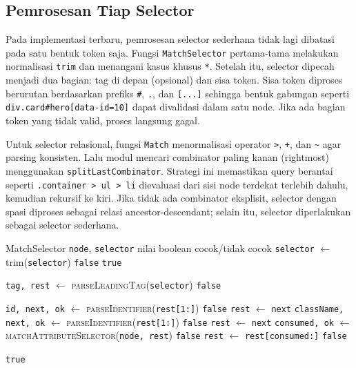 \subsection{Pemrosesan Tiap Selector}

Pada implementasi terbaru, pemrosesan selector sederhana tidak lagi dibatasi pada satu bentuk token saja. Fungsi \texttt{MatchSelector} pertama-tama melakukan normalisasi \texttt{trim} dan menangani kasus khusus \texttt{*}. Setelah itu, selector dipecah menjadi dua bagian: tag di depan (opsional) dan sisa token. Sisa token diproses berurutan berdasarkan prefiks \texttt{\#}, \texttt{.}, dan \texttt{[...]} sehingga bentuk gabungan seperti \texttt{div.card\#hero[data-id=10]} dapat divalidasi dalam satu node. Jika ada bagian token yang tidak valid, proses langsung gagal.

Untuk selector relasional, fungsi \texttt{Match} menormalisasi operator \texttt{>}, \texttt{+}, dan \texttt{\textasciitilde{}} agar parsing konsisten. Lalu modul mencari combinator paling kanan (rightmost) menggunakan \texttt{splitLastCombinator}. Strategi ini memastikan query berantai seperti \texttt{.container > ul > li} dievaluasi dari sisi node terdekat terlebih dahulu, kemudian rekursif ke kiri. Jika tidak ada combinator eksplisit, selector dengan spasi diproses sebagai relasi ancestor-descendant; selain itu, selector diperlakukan sebagai selector sederhana.

\begin{ieeealgorithm}{MatchSelector}
    \Require \texttt{node}, \texttt{selector}
    \Ensure nilai boolean cocok/tidak cocok
    \State \texttt{selector} $\gets$ trim(\texttt{selector})
    \State \Return \texttt{false}
    \EndIf
    \State \Return \texttt{true}
    \EndIf

    \State \texttt{tag, rest} $\gets$ \textsc{parseLeadingTag}(\texttt{selector})
    \State \Return \texttt{false}
    \EndIf

    \State \texttt{id, next, ok} $\gets$ \textsc{parseIdentifier}(\texttt{rest[1:]})
    \State \Return \texttt{false}
    \EndIf
    \State \texttt{rest} $\gets$ \texttt{next}
    \State \texttt{className, next, ok} $\gets$ \textsc{parseIdentifier}(\texttt{rest[1:]})
    \State \Return \texttt{false}
    \EndIf
    \State \texttt{rest} $\gets$ \texttt{next}
    \ElsIf{karakter pertama \texttt{rest} adalah \texttt{"["}}
    \State \texttt{consumed, ok} $\gets$ \textsc{matchAttributeSelector}(\texttt{node, rest})
    \State \Return \texttt{false}
    \EndIf
    \State \texttt{rest} $\gets$ \texttt{rest[consumed:]}
    \Else
    \State \Return \texttt{false}
    \EndIf
    \EndWhile

    \State \Return \texttt{true}
\end{ieeealgorithm}

